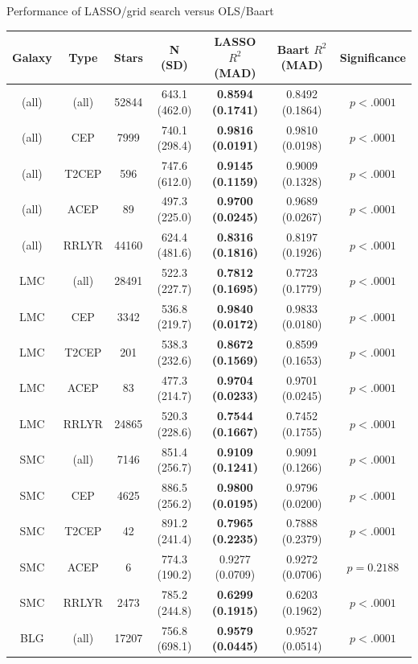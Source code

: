 \documentclass{beamer}
\begin{document}
\begin{frame}{Performance of LASSO/grid search versus OLS/Baart}
  \begin{table}[ht]
  \tiny
  \begin{tabular}{ c c c c c c c }
    Galaxy & Type & Stars & N (SD) & LASSO $R^2$ (MAD) & Baart $R^2$ (MAD) & Significance \\ \hline
    (all) & (all) & 52844 & 643.1 (462.0) & \textbf{ 0.8594 (0.1741)} &  0.8492 (0.1864) & $p < .0001$ \\
    (all) & CEP & 7999 & 740.1 (298.4) & \textbf{ 0.9816 (0.0191)} &  0.9810 (0.0198) & $p < .0001$ \\
    (all) & T2CEP & 596 & 747.6 (612.0) & \textbf{ 0.9145 (0.1159)} &  0.9009 (0.1328) & $p < .0001$ \\
    (all) & ACEP & 89 & 497.3 (225.0) & \textbf{ 0.9700 (0.0245)} &  0.9689 (0.0267) & $p < .0001$ \\
    (all) & RRLYR & 44160 & 624.4 (481.6) & \textbf{ 0.8316 (0.1816)} &  0.8197 (0.1926) & $p < .0001$ \\
    LMC & (all) & 28491 & 522.3 (227.7) & \textbf{ 0.7812 (0.1695)} &  0.7723 (0.1779) & $p < .0001$ \\
    LMC & CEP & 3342 & 536.8 (219.7) & \textbf{ 0.9840 (0.0172)} &  0.9833 (0.0180) & $p < .0001$ \\
    LMC & T2CEP & 201 & 538.3 (232.6) & \textbf{ 0.8672 (0.1569)} &  0.8599 (0.1653) & $p < .0001$ \\
    LMC & ACEP & 83 & 477.3 (214.7) & \textbf{ 0.9704 (0.0233)} &  0.9701 (0.0245) & $p < .0001$ \\
    LMC & RRLYR & 24865 & 520.3 (228.6) & \textbf{ 0.7544 (0.1667)} &  0.7452 (0.1755) & $p < .0001$ \\
    SMC & (all) & 7146 & 851.4 (256.7) & \textbf{ 0.9109 (0.1241)} &  0.9091 (0.1266) & $p < .0001$ \\
    SMC & CEP & 4625 & 886.5 (256.2) & \textbf{ 0.9800 (0.0195)} &  0.9796 (0.0200) & $p < .0001$ \\
    SMC & T2CEP & 42 & 891.2 (241.4) & \textbf{ 0.7965 (0.2235)} &  0.7888 (0.2379) & $p < .0001$ \\
    SMC & ACEP & 6 & 774.3 (190.2) &  0.9277 (0.0709) &  0.9272 (0.0706) & $p = 0.2188 $ \\
    SMC & RRLYR & 2473 & 785.2 (244.8) & \textbf{ 0.6299 (0.1915)} &  0.6203 (0.1962) & $p < .0001$ \\
    BLG & (all) & 17207 & 756.8 (698.1) & \textbf{ 0.9579 (0.0445)} &  0.9527 (0.0514) & $p < .0001$ \\

\end{tabular}
\end{table}
\end{frame}
\end{document}
